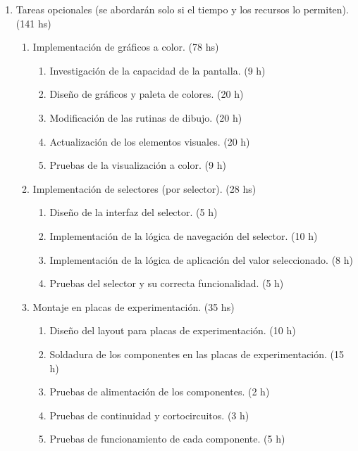 \documentclass[
11pt, %
]{charter}
\begin{document}
\begin{enumerate}
\begin{enumerate}
    \end{enumerate}
	\item Tareas opcionales (se abordarán solo si el tiempo y los recursos lo permiten). (141 hs)
    \begin{enumerate}
		\item Implementación de gráficos a color. (78 hs)
        \begin{enumerate}
			\item Investigación de la capacidad de la pantalla. (9 h)
			\item Diseño de gráficos y paleta de colores. (20 h)
			\item Modificación de las rutinas de dibujo. (20 h)
			\item Actualización de los elementos visuales. (20 h)
			\item Pruebas de la visualización a color. (9 h)
        \end{enumerate}
		\item Implementación de selectores (por selector). (28 hs)
        \begin{enumerate}
			\item Diseño de la interfaz del selector. (5 h)
			\item Implementación de la lógica de navegación del selector. (10 h)
			\item Implementación de la lógica de aplicación del valor seleccionado. (8 h)
			\item Pruebas del selector y su correcta funcionalidad. (5 h)
        \end{enumerate}
		\item Montaje en placas de experimentación. (35 hs)
        \begin{enumerate}
			\item Diseño del layout para placas de experimentación. (10 h)
			\item Soldadura de los componentes en las placas de experimentación. (15 h)
			\item Pruebas de alimentación de los componentes. (2 h)
			\item Pruebas de continuidad y cortocircuitos. (3 h)
			\item Pruebas de funcionamiento de cada componente. (5 h)
        \end{enumerate}
    \end{enumerate}
\end{enumerate}
\end{document}

